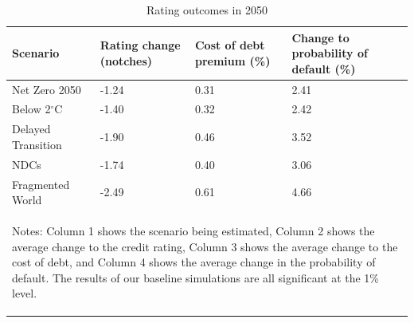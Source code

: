 
\begin{table}[tb!]
\footnotesize
\center
\caption{Rating outcomes in 2050}
\label{tab:tab3}
\begin{tabularx}{\textwidth}{X X X X}
\\
\hline
Scenario & Rating change (notches) & Cost of debt premium (\%) & Change to probability of default (\%) \\
\hline
Net Zero 2050 & -1.24  &  0.31  &  2.41  \\
Below 2$^\circ$C & -1.40  &  0.32  &  2.42 \\
Delayed Transition & -1.90  &  0.46  &  3.52 \\
NDCs & -1.74  &  0.40  &  3.06 \\
Fragmented World & -2.49  &  0.61  &  4.66 \\
\hline
\multicolumn{4}{p{\textwidth}}{\begin{footnotesize}Notes: Column 1 shows the scenario being estimated, Column 2 shows the average change to the credit rating, Column 3 shows the average change to the cost of debt, and Column 4 shows the average change in the probability of default. The results of our baseline simulations are all significant at the 1\% level.
\end{footnotesize}
}
\end{tabularx}
\end{table}
